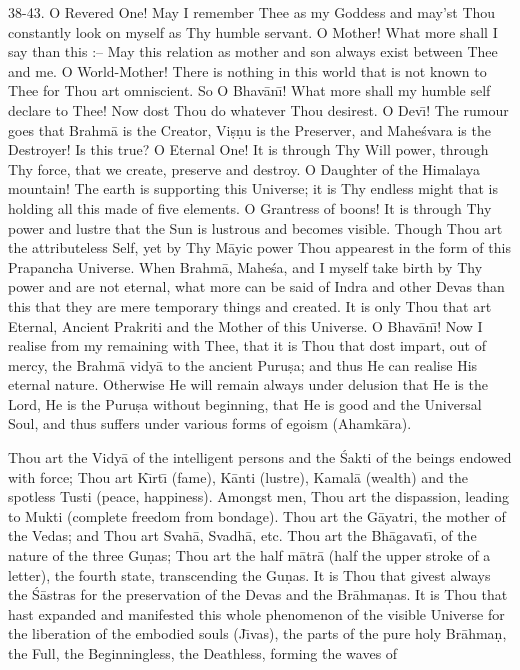 38-43. O Revered One! May I remember Thee as my Goddess and may'st Thou constantly look on myself as Thy humble servant. O Mother! What more shall I say than this :-- May this relation as mother and son always exist between Thee and me. O World-Mother! There is nothing in this world that is not known to Thee for Thou art omniscient. So O Bhav\=an\={\i}! What more shall my humble self declare to Thee! Now dost Thou do whatever Thou desirest. O Dev\={\i}! The rumour goes that Brahm\=a is the Creator, Vi\d{s}\d{n}u is the Preserver, and Mahe\'svara is the Destroyer! Is this true? O Eternal One! It is through Thy Will power, through Thy force, that we create, preserve and destroy. O Daughter of the Himalaya mountain! The earth is supporting this Universe; it is Thy endless might that is holding all this made of five elements. O Grantress of boons! It is through Thy power and lustre that the Sun is lustrous and becomes visible. Though Thou art the attributeless Self, yet by Thy M\=ayic power Thou appearest in the form of this Prapancha Universe. When Brahm\=a, Mahe\'sa, and I myself take birth by Thy power and are not eternal, what more can be said of Indra and other Devas than this that they are mere temporary things and created. It is only Thou that art Eternal, Ancient Prakriti and the Mother of this Universe. O Bhav\=an\={\i}! Now I realise from my remaining with Thee, that it is Thou that dost impart, out of mercy, the Brahm\=a vidy\=a to the ancient Puru\d{s}a; and thus He can realise His eternal nature. Otherwise He will remain always under delusion that He is the Lord, He is the Puru\d{s}a without beginning, that He is good and the Universal Soul, and thus suffers under various forms of egoism (Ahamk\=ara).

Thou art the Vidy\=a of the intelligent persons and the \'Sakti of the beings endowed with force; Thou art K\={\i}rt\={\i} (fame), K\=anti (lustre), Kamal\=a (wealth) and the spotless Tusti (peace, happiness). Amongst men, Thou art the dispassion, leading to Mukti (complete freedom from bondage). Thou art the G\=ayatri, the mother of the Vedas; and Thou art Svah\=a, Svadh\=a, etc. Thou art the Bh\=agavat\={\i}, of the nature of the three Gu\d{n}as; Thou art the half m\=atr\=a (half the upper stroke of a letter), the fourth state, transcending the Gu\d{n}as. It is Thou that givest always the \'S\=astras for the preservation of the Devas and the Br\=ahma\d{n}as. It is Thou that hast expanded and manifested this whole phenomenon of the visible Universe for the liberation of the embodied souls (J\={\i}vas), the parts of the pure holy Br\=ahma\d{n}, the Full, the Beginningless, the Deathless, forming the waves of

